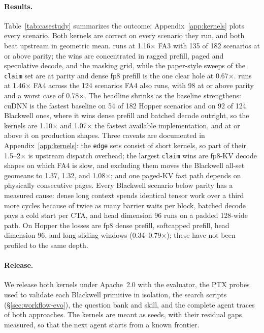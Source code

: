 \paragraph{Results.} Table~\ref{tab:casestudy} summarizes the outcome; Appendix~\ref{app:kernels}
plots every scenario. Both kernels are correct on every scenario they run, and both beat upstream in
geometric mean. \fathree runs at 1.16$\times$ FA3 with 135 of 182 scenarios at or above parity; the
wins are concentrated in ragged prefill, paged and speculative decode, and the masking grid, while
the paper-style sweeps of the \texttt{claim} set are at parity and dense fp8 prefill is the one clear
hole at 0.67$\times$. \fafour runs at 1.46$\times$ FA4 across the 124 scenarios FA4 also runs, with
98 at or above parity and a worst case of 0.78$\times$. The headline shrinks as the baseline
strengthens: cuDNN is the fastest baseline on 54 of 182 Hopper scenarios and on 92 of 124 Blackwell
ones, where it wins dense prefill and batched decode outright, so the kernels are 1.10$\times$ and
1.07$\times$ the fastest available implementation, and at or above it on production shapes. Three caveats are documented in Appendix~\ref{app:kernels}: the \texttt{edge}
sets consist of short kernels, so part of their 1.5--2$\times$ is upstream dispatch overhead; the
largest \texttt{claim} wins are fp8-KV decode shapes on which FA4 is slow, and excluding them moves
the Blackwell all-set geomeans to 1.37, 1.32, and 1.08$\times$; and one paged-KV fast path depends on
physically consecutive pages. Every Blackwell scenario below parity has a measured cause: dense long
context spends identical tensor work over a third more cycles because of twice as many barrier waits
per block, batched decode pays a cold start per CTA, and head dimension 96 runs on a padded 128-wide
path. On Hopper the losses are fp8 dense prefill, softcapped prefill, head dimension 96, and long
sliding windows (0.34--0.79$\times$); these have not been profiled to the same depth.

\paragraph{Release.} We release both kernels under Apache~2.0 with the evaluator, the PTX probes used
to validate each Blackwell primitive in isolation, the search scripts (\S\ref{sec:workflow-evo}),
the question bank and skill, and the complete agent traces of both approaches. The kernels are meant as seeds, with their residual
gaps measured, so that the next agent starts from a known frontier.
